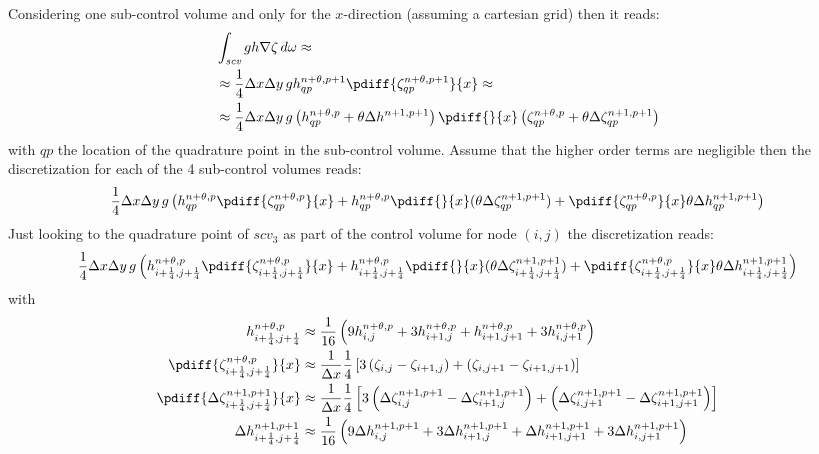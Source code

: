 Considering one sub-control volume and only for the $x$-direction (assuming a cartesian grid) then it reads:
\begin{align}
    & \int_{\textit{scv}} gh \nabla \zeta \, d\omega  \approx
    \\
    & \approx \quart \Dx\Dy\, g h^{n+\theta,p+1}_{qp} \pdiff{\zeta^{n+\theta,p+1}_{qp}}{x}
    \approx \\
   & \approx \quart  \Dx\Dy\, g \left( h^{n+\theta,p}_{qp} + \theta \Delta h^{n+1,p+1}\right)  \pdiff{}{x}\left(\zeta^{n+\theta,p}_{qp} + \theta \Delta \zeta^{n+1,p+1}_{qp}\right)
\end{align}
with $qp$ the location of the quadrature point in the sub-control volume.
Assume that the higher order terms are negligible then the discretization for each of the 4 sub-control volumes reads:
\begin{align}
        \quart  \Dx\Dy\, g \left(
        h^{n+\theta, p}_{qp} \pdiff{\zeta^{n+\theta, p}_{qp}}{x}
        + h^{n+\theta, p}_{qp} \pdiff{}{x} (\theta \Delta \zeta^{n+1, p+1}_{qp})
        + \pdiff{\zeta^{n+\theta, p}_{qp}}{x} \theta \Delta h^{n+1,p+1}_{qp}
          \right)
\end{align}
Just looking to the quadrature point of $scv_3$ as part of the control volume for node $(i,j)$ the discretization reads:
\begin{align}
    \quart  \Dx\Dy\, g \left(
    h^{n+\theta, p}_{i+\quart, j+\quart} \pdiff{\zeta^{n+\theta, p}_{i+\quart, j+\quart}}{x}
    + h^{n+\theta, p}_{i+\quart, j+\quart} \pdiff{}{x}(\theta \Delta \zeta^{n+1, p+1}_{i+\quart, j+\quart})
    + \pdiff{\zeta^{n+\theta, p}_{i+\quart, j+\quart}}{x} \theta \Delta h^{n+1,p+1}_{i+\quart, j+\quart}
    \right)
\end{align}
with
\begin{align}
    h^{n+\theta, p}_{i+\quart, j+\quart} & \approx
    \frac{1}{16}\left( 9h^{n+\theta, p}_{i, j} + 3 h^{n+\theta, p}_{i+1,j} + h^{n+\theta, p}_{i+1, j+1} + 3  h^{n+\theta, p}_{i, j+1}\right)
    \\*
    \pdiff{\zeta^{n+\theta, p}_{i+\quart, j+\quart}}{x} & \approx
   \frac{1}{\Dx}\quart\left[ 3 \left(\zeta_{i,j} - \zeta_{i+1,j}\right) + \left( \zeta_{i,j+1} - \zeta_{i+1,j+1}\right) \right]
   \\*
   \pdiff{\Delta \zeta^{n+1, p+1}_{i+\quart, j+\quart}}{x} & \approx
   \frac{1}{\Dx}\quart\left[ 3 \left(\Delta\zeta^{n+1, p+1}_{i,j} - \Delta\zeta^{n+1, p+1}_{i+1,j}\right) + \left(\Delta\zeta^{n+1, p+1}_{i,j+1} - \Delta\zeta^{n+1, p+1}_{i+1,j+1} \right) \right]
   \\*
   \Delta h^{n+1,p+1}_{i+\quart, j+\quart} & \approx
   \frac{1}{16}\left( 9\Delta h^{n+1,p+1}_{i, j} + 3 \Delta h^{n+1,p+1}_{i+1,j} + \Delta h^{n+1,p+1}_{i+1, j+1} + 3  \Delta h^{n+1,p+1}_{i, j+1}\right)
\end{align}
